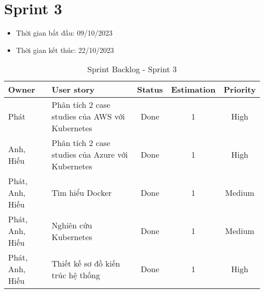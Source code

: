 \section{Sprint 3}
\begin{itemize}
    \item Thời gian bắt đầu: 09/10/2023
    \item Thời gian kết thúc: 22/10/2023
\end{itemize}
\begin{table}[H]
    \begin{tabular}{|m{2.5cm}|m{6cm}|c|c|c|}
    \hline
    \textbf{Owner}  & \textbf{User story}                                & \textbf{Status} & \textbf{Estimation} & \textbf{Priority} \\ \hline
    Phát                 & Phân tích 2 case studies của AWS với Kubernetes                       & Done            & 1                   & High           \\ \hline
    Anh, Hiếu                 & Phân tích 2 case studies của Azure với Kubernetes                       & Done            & 1                   & High           \\ \hline
    Phát, Anh, Hiếu                  & Tìm hiểu Docker                       & Done            & 1                   & Medium          \\ \hline
    Phát, Anh, Hiếu                 & Nghiên cứu Kubernetes                       & Done            & 1                   & Medium          \\ \hline
    Phát, Anh, Hiếu                 & Thiết kế sơ đồ kiến trúc hệ thống                       & Done            & 1                   & High           \\ \hline
    \end{tabular}
    \caption{Sprint Backlog - Sprint 3}
    \label{tab:sprint-3}
\end{table}
